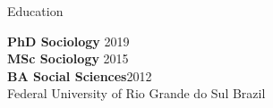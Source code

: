 \begin{rSection}{Education}

{\bf PhD Sociology} \hfill {2019} \\
{\bf MSc Sociology} \hfill {2015} \\
{\bf BA Social Sciences}\hfill {2012}\\
{Federal University of Rio Grande do Sul} \hfill { Brazil}

\end{rSection}